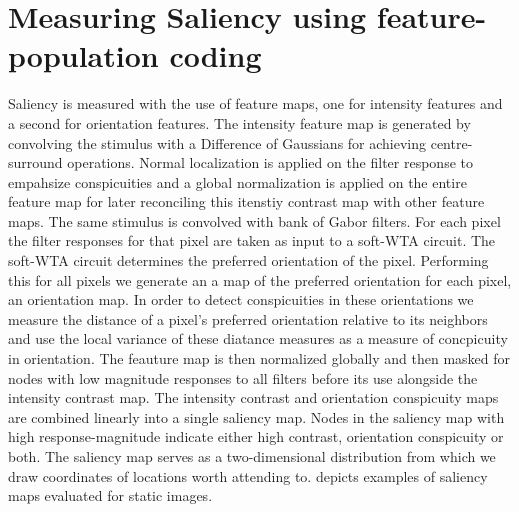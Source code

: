 \documentclass{report}
\begin{document}
\section{Measuring Saliency using feature-population coding}

Saliency is measured with the use of feature maps, one for intensity features and a second for orientation features. The intensity feature map is generated by convolving the stimulus with a Difference of Gaussians for achieving centre-surround operations. Normal localization is applied on the filter response to empahsize conspicuities and a global normalization is applied on the entire feature map for later reconciling this itenstiy contrast map with other feature maps.  
The same stimulus is convolved with bank of Gabor filters. For each pixel the filter responses for that pixel are taken as input to a soft-WTA circuit. The soft-WTA circuit determines the preferred orientation of the pixel. Performing this for all pixels we generate an a map of the preferred orientation for each pixel, an orientation map. In order to detect conspicuities in these orientations we measure the distance of a pixel's preferred orientation relative to its neighbors and use the local variance of these diatance measures as a measure of concpicuity in orientation. The feauture map is then normalized globally and then masked for nodes with low magnitude responses to all filters before its use alongside the intensity contrast map.
The intensity contrast and orientation conspicuity maps are combined linearly into a single saliency map. Nodes in the saliency map with high response-magnitude indicate either high contrast, orientation conspicuity or both. The saliency map serves as a two-dimensional distribution from which we draw coordinates of locations worth attending to.  depicts examples of saliency maps evaluated for static images.
\end{document}
